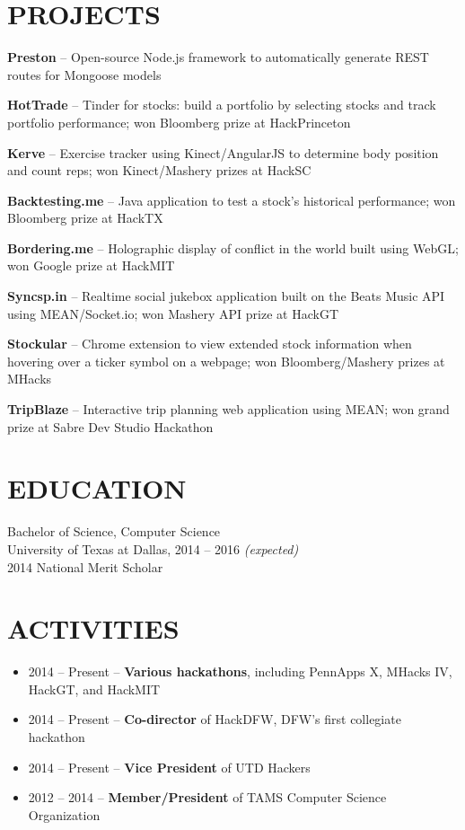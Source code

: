 \documentclass{res} %
\begin{document}
\section{PROJECTS}

\textbf{Preston} -- Open-source Node.js framework to automatically generate REST routes for Mongoose models

\textbf{HotTrade} -- Tinder for stocks: build a portfolio by selecting stocks and track portfolio performance; won Bloomberg prize at HackPrinceton

\textbf{Kerve} -- Exercise tracker using Kinect/AngularJS to determine body position and count reps; won Kinect/Mashery prizes at HackSC

\textbf{Backtesting.me} -- Java application to test a stock's historical performance; won Bloomberg prize at HackTX

\textbf{Bordering.me} -- Holographic display of conflict in the world built using WebGL; won Google prize at HackMIT

\textbf{Syncsp.in} -- Realtime social jukebox application built on the Beats Music API using MEAN/Socket.io; won Mashery API prize at HackGT

\textbf{Stockular} -- Chrome extension to view extended stock information when hovering over a ticker symbol on a webpage; won Bloomberg/Mashery prizes at MHacks

\textbf{TripBlaze} -- Interactive trip planning web application using MEAN; won grand prize at Sabre Dev Studio Hackathon

\section{EDUCATION}

Bachelor of Science, Computer Science \\
University of Texas at Dallas, 2014 -- 2016 \textit {(expected)} \\
2014 National Merit Scholar

\section{ACTIVITIES}

\begin{itemize} \itemsep -2pt
  \item 2014 -- Present -- \textbf{Various hackathons}, including PennApps X, MHacks IV, HackGT, and HackMIT
  \item 2014 -- Present -- \textbf{Co-director} of HackDFW, DFW's first collegiate hackathon
  \item 2014 -- Present -- \textbf{Vice President} of UTD Hackers
  \item 2012 -- 2014 -- \textbf{Member/President} of TAMS Computer Science Organization
\end{itemize}
\end{document}
